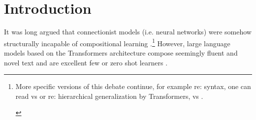 \documentclass[11pt]{article}
\begin{document}
\begin{abstract}
\end{abstract}

\section{Introduction}
It was long argued that connectionist models (i.e. neural networks) were somehow structurally incapable of compositional learning \cite{FodorPylyshyn1988}.\footnote{\begin{footnotesize}
More specific versions of this debate continue, for example re: syntax, one can read \cite{vanschijndel2019quantitydoesntbuyquality} vs \cite{goldberg2019assessingbertssyntacticabilities} or re: hierarchical generalization by Transformers, \cite{petty2021transformersgeneralizelinearly} vs \cite{murty2023grokkinghierarchicalstructurevanilla}.
\end{footnotesize}
} 
However, large language models based on the Transformers architecture compose seemingly fluent and novel text and are excellent few or zero shot learners \cite{Brown2020}.
\end{document}
